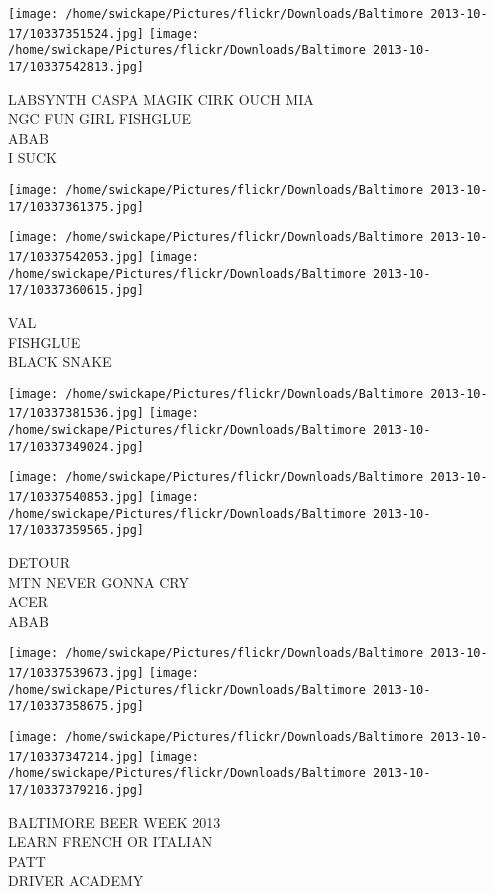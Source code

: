 \documentclass[10pt,letterpaper]{article}
\begin{document}
\texttt{[image: /home/swickape/Pictures/flickr/Downloads/Baltimore 2013-10-17/10337351524.jpg]}
\texttt{[image: /home/swickape/Pictures/flickr/Downloads/Baltimore 2013-10-17/10337542813.jpg]}

LABSYNTH CASPA MAGIK CIRK OUCH MIA\\
NGC FUN GIRL FISHGLUE\\
ABAB\\
I SUCK
\pagebreak

\texttt{[image: /home/swickape/Pictures/flickr/Downloads/Baltimore 2013-10-17/10337361375.jpg]}

\vspace{0.25in}
\texttt{[image: /home/swickape/Pictures/flickr/Downloads/Baltimore 2013-10-17/10337542053.jpg]}
\texttt{[image: /home/swickape/Pictures/flickr/Downloads/Baltimore 2013-10-17/10337360615.jpg]}

VAL\\
FISHGLUE\\
BLACK SNAKE
\pagebreak

\texttt{[image: /home/swickape/Pictures/flickr/Downloads/Baltimore 2013-10-17/10337381536.jpg]}
\texttt{[image: /home/swickape/Pictures/flickr/Downloads/Baltimore 2013-10-17/10337349024.jpg]}

\texttt{[image: /home/swickape/Pictures/flickr/Downloads/Baltimore 2013-10-17/10337540853.jpg]}
\texttt{[image: /home/swickape/Pictures/flickr/Downloads/Baltimore 2013-10-17/10337359565.jpg]}

DETOUR\\
MTN NEVER GONNA CRY\\
ACER\\
ABAB
\pagebreak

\texttt{[image: /home/swickape/Pictures/flickr/Downloads/Baltimore 2013-10-17/10337539673.jpg]}
\texttt{[image: /home/swickape/Pictures/flickr/Downloads/Baltimore 2013-10-17/10337358675.jpg]}

\texttt{[image: /home/swickape/Pictures/flickr/Downloads/Baltimore 2013-10-17/10337347214.jpg]}
\texttt{[image: /home/swickape/Pictures/flickr/Downloads/Baltimore 2013-10-17/10337379216.jpg]}

BALTIMORE BEER WEEK 2013\\
LEARN FRENCH OR ITALIAN\\
PATT\\
DRIVER ACADEMY
\pagebreak
\end{document}
